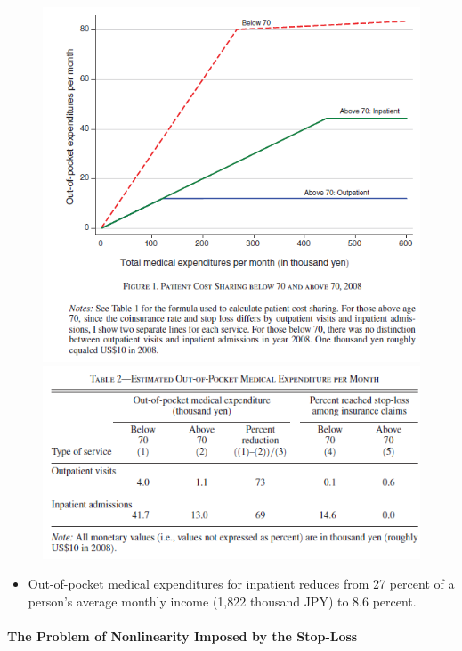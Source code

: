 \documentclass[../root]{subfiles}
\begin{document}
    \begin{figure}[ht]
      \centering
      \includegraphics[scale = 1]{0710tanji/F1}
      \includegraphics[scale = 1]{0710tanji/T2}
    \end{figure}

    \begin{itemize}
      \item Out-of-pocket medical expenditures for inpatient reduces from 27 percent of a person’s average monthly income (1,822 thousand JPY) to 8.6 percent.
    \end{itemize}

    \paragraph{The Problem of Nonlinearity Imposed by the Stop-Loss}
\end{document}
